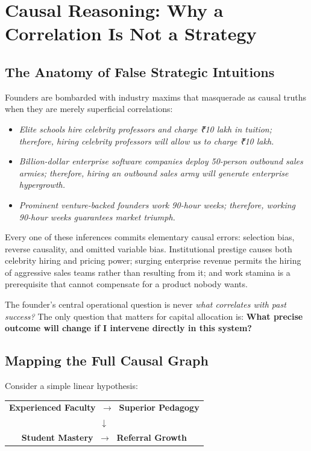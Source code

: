 \section{Causal Reasoning: Why a Correlation Is Not a Strategy}

\subsection{The Anatomy of False Strategic Intuitions}

Founders are bombarded with industry maxims that masquerade as causal truths when they are merely superficial correlations:
\begin{itemize}[leftmargin=10pt,itemsep=1pt,topsep=1pt]
  \item \textit{Elite schools hire celebrity professors and charge ₹10 lakh in tuition; therefore, hiring celebrity professors will allow us to charge ₹10 lakh.}
  \item \textit{Billion-dollar enterprise software companies deploy 50-person outbound sales armies; therefore, hiring an outbound sales army will generate enterprise hypergrowth.}
  \item \textit{Prominent venture-backed founders work 90-hour weeks; therefore, working 90-hour weeks guarantees market triumph.}
\end{itemize}

Every one of these inferences commits elementary causal errors: selection bias, reverse causality, and omitted variable bias. Institutional prestige causes both celebrity hiring and pricing power; surging enterprise revenue permits the hiring of aggressive sales teams rather than resulting from it; and work stamina is a prerequisite that cannot compensate for a product nobody wants.

The founder's central operational question is never \textit{what correlates with past success?} The only question that matters for capital allocation is: \textbf{What precise outcome will change if I intervene directly in this system?}

\subsection{Mapping the Full Causal Graph}

Consider a simple linear hypothesis:
\begin{center}
\small
\begin{tabular}{c}
\textbf{Experienced Faculty} $\;\longrightarrow\;$ \textbf{Superior Pedagogy} \\
$\downarrow$ \\
\textbf{Student Mastery} $\;\longrightarrow\;$ \textbf{Referral Growth}
\end{tabular}
\end{center}

